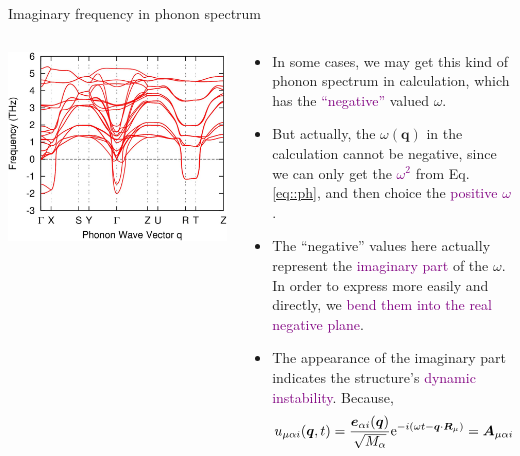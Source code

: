 \documentclass{beamer}
\begin{document}
\begin{frame}{Imaginary frequency in phonon spectrum}
\begin{columns}
  \begin{column}{0.4\textwidth}
    \begin{center}
      \includegraphics[width=\textwidth]{figure/ps-im.png}
    \end{center}
  \end{column}
  \begin{column}{0.6\textwidth}
    \begin{block}{}
      \begin{itemize}\footnotesize
        \item In some cases, we may get this kind of phonon spectrum in calculation, which has the \textcolor{purple}{``negative''} valued \(\omega\). 
        \item But actually, the \(\omega(\bm{q})\) in the calculation cannot be negative, since we can only get the \textcolor{purple}{\(\omega^2\)} from Eq. \eqref{eq::ph}, and then choice the \textcolor{purple}{positive \(\omega\)}.
        \item The ``negative'' values here actually represent the \textcolor{purple}{imaginary part} of the \(\omega\). In order to express more easily and directly, we \textcolor{purple}{bend them into the real negative plane}.
        \item The appearance of the imaginary part indicates the structure's \textcolor{purple}{dynamic instability}. Because,
        \begin{equation}\scriptsize
          u_{\mu\alpha{}i}(\bm{q},t) = \frac{\bm{e}_{\alpha{}i}(\bm{q})}{\sqrt{M_\alpha}}\mathrm{e}^{-i(\omega{}t-\bm{q}\cdot\bm{R}_\mu)} = \bm{A}_{\mu\alpha{}i}\mathrm{e}^{-i\omega{}t}
        \end{equation}
      \end{itemize}
    \end{block}
  \end{column}
\end{columns}
\end{frame}
\end{document}
